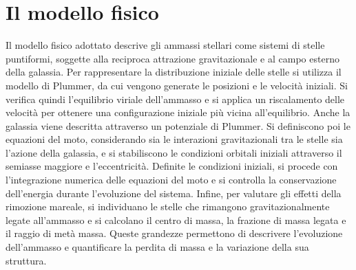 \chapter{Il modello fisico}
\label{cha:modello-fisico}
Il modello fisico adottato descrive gli ammassi stellari come sistemi di stelle puntiformi, soggette alla reciproca attrazione gravitazionale e al campo esterno della galassia. Per rappresentare la distribuzione iniziale delle stelle si utilizza il modello di Plummer, da cui vengono generate le posizioni e le velocità iniziali. Si verifica quindi l'equilibrio viriale dell'ammasso e si applica un riscalamento delle velocità per ottenere una configurazione iniziale più vicina all'equilibrio. Anche la galassia viene descritta attraverso un potenziale di Plummer. Si definiscono poi le equazioni del moto, considerando sia le interazioni gravitazionali tra le stelle sia l'azione della galassia, e si stabiliscono le condizioni orbitali iniziali attraverso il semiasse maggiore e l'eccentricità.
Definite le condizioni iniziali, si procede con l'integrazione numerica delle equazioni del moto e si controlla la conservazione dell'energia durante l'evoluzione del sistema. Infine, per valutare gli effetti della rimozione mareale, si individuano le stelle che rimangono gravitazionalmente legate all'ammasso e si calcolano il centro di massa, la frazione di massa legata e il raggio di metà massa. Queste grandezze permettono di descrivere l'evoluzione dell'ammasso e quantificare la perdita di massa e la variazione della sua struttura.

